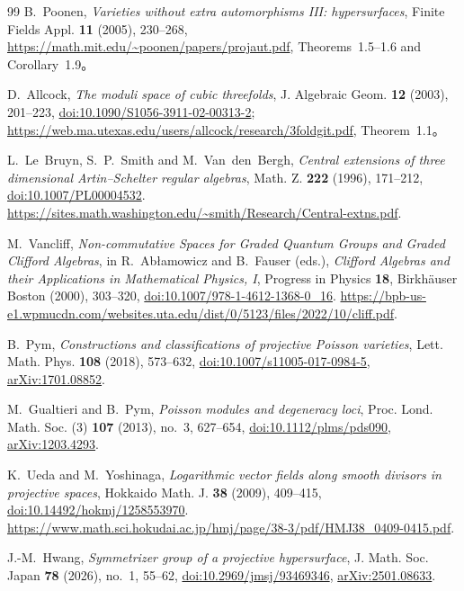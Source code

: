 \documentclass[11pt,a4paper]{ltjsarticle}
\numberwithin{equation}{section}
\begin{document}
\begin{thebibliography}{99}
B.~Poonen, \emph{Varieties without extra automorphisms III: hypersurfaces},
Finite Fields Appl. \textbf{11} (2005), 230--268,
\url{https://math.mit.edu/~poonen/papers/projaut.pdf},
Theorems~1.5--1.6 and Corollary~1.9。

D.~Allcock, \emph{The moduli space of cubic threefolds},
J. Algebraic Geom. \textbf{12} (2003), 201--223,
\href{https://doi.org/10.1090/S1056-3911-02-00313-2}{doi:10.1090/S1056-3911-02-00313-2};
\url{https://web.ma.utexas.edu/users/allcock/research/3foldgit.pdf}, Theorem~1.1。


L.~Le~Bruyn, S.~P.~Smith and M.~Van~den~Bergh,
\textit{Central extensions of three dimensional Artin--Schelter regular algebras},
Math. Z. \textbf{222} (1996), 171--212,
\href{https://doi.org/10.1007/PL00004532}{doi:10.1007/PL00004532}.
\url{https://sites.math.washington.edu/~smith/Research/Central-extns.pdf}.

M.~Vancliff,
\textit{Non-commutative Spaces for Graded Quantum Groups and Graded Clifford Algebras},
in R.~Ab{\l}amowicz and B.~Fauser (eds.),
\textit{Clifford Algebras and their Applications in Mathematical Physics, I},
Progress in Physics \textbf{18}, Birkh\"auser Boston (2000), 303--320,
\href{https://doi.org/10.1007/978-1-4612-1368-0_16}{doi:10.1007/978-1-4612-1368-0\_16}.
\url{https://bpb-us-e1.wpmucdn.com/websites.uta.edu/dist/0/5123/files/2022/10/cliff.pdf}.

B.~Pym,
\textit{Constructions and classifications of projective Poisson varieties},
Lett. Math. Phys. \textbf{108} (2018), 573--632,
\href{https://doi.org/10.1007/s11005-017-0984-5}{doi:10.1007/s11005-017-0984-5},
\href{https://arxiv.org/abs/1701.08852}{arXiv:1701.08852}.

M.~Gualtieri and B.~Pym,
\textit{Poisson modules and degeneracy loci},
Proc. Lond. Math. Soc. (3) \textbf{107} (2013), no.~3, 627--654,
\href{https://doi.org/10.1112/plms/pds090}{doi:10.1112/plms/pds090},
\href{https://arxiv.org/abs/1203.4293}{arXiv:1203.4293}.

K.~Ueda and M.~Yoshinaga,
\textit{Logarithmic vector fields along smooth divisors in projective spaces},
Hokkaido Math. J. \textbf{38} (2009), 409--415,
\href{https://doi.org/10.14492/hokmj/1258553970}{doi:10.14492/hokmj/1258553970}.
\url{https://www.math.sci.hokudai.ac.jp/hmj/page/38-3/pdf/HMJ38_0409-0415.pdf}.

J.-M.~Hwang,
\textit{Symmetrizer group of a projective hypersurface},
J. Math. Soc. Japan \textbf{78} (2026), no.~1, 55--62,
\href{https://doi.org/10.2969/jmsj/93469346}{doi:10.2969/jmsj/93469346},
\href{https://arxiv.org/abs/2501.08633}{arXiv:2501.08633}.

\end{thebibliography}
\end{document}
